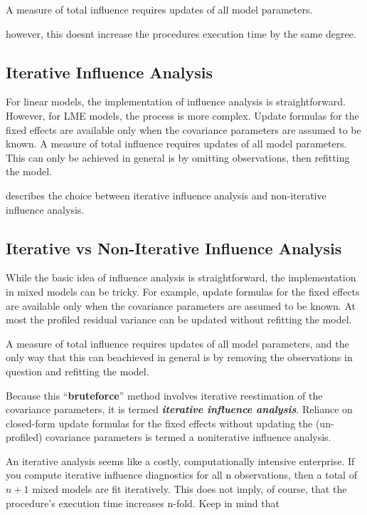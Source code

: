 \documentclass[12pt, a4paper]{article}
\begin{document}
A measure of total influence requires updates of all model parameters.

however, this doesnt increase the procedures execution time by the same degree.
\subsection{Iterative Influence Analysis}

For linear models, the implementation of influence analysis is straightforward.
However, for LME models, the process is more complex. Update formulas for the fixed effects are available only when the covariance parameters are assumed to be known. A measure of total influence requires updates of all model parameters.
This can only be achieved in general is by omitting observations, then refitting the model.

\citet{schabenberger} describes the choice between  iterative influence analysis and  non-iterative influence analysis.

\subsection{Iterative vs Non-Iterative Influence Analysis}
While the basic idea of influence analysis is straightforward, the implementation in mixed models can be tricky. For example, update formulas for the fixed effects are available only when the covariance parameters	are assumed to be known. At most the profiled residual variance can be updated without refitting the model.
	
A measure of total influence requires updates of all model parameters, and the only way that this can beachieved in general is by removing the observations in question and refitting the model. 
	
Because this “\textbf{bruteforce}” method involves iterative reestimation of the covariance parameters, it is termed \textbf{\textit{iterative influence analysis}}. Reliance on closed-form update formulas for the fixed effects without updating the (un-profiled) covariance parameters is termed a noniterative influence analysis.
	
An iterative analysis seems like a costly, computationally intensive enterprise. If you compute iterative influence diagnostics for all n observations, then a total of $n + 1$ mixed models are fit iteratively. This does not imply, of course, that the procedure’s execution time increases n-fold. Keep in mind that
\end{document}
